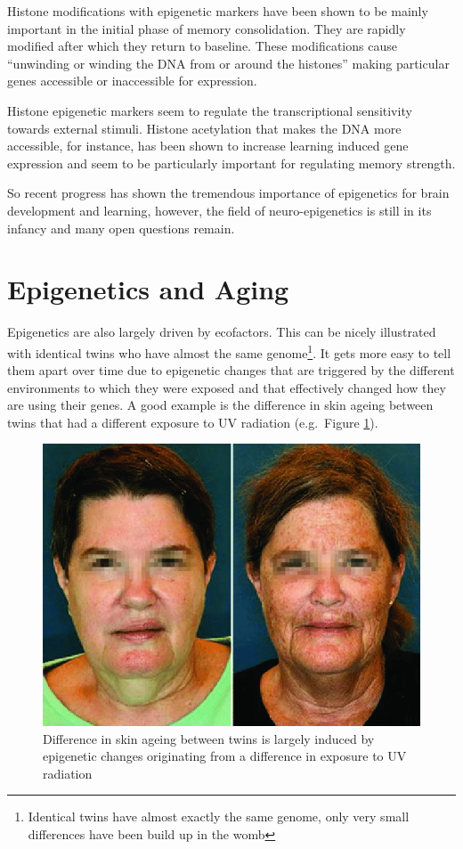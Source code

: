 \documentclass[
  11pt,
]{book}
\begin{document}
Histone modifications with epigenetic markers have been shown to be mainly important in the initial phase of memory consolidation. They are rapidly modified after which they return to baseline. These modifications cause ``unwinding or winding the DNA from or around the histones'' making particular genes accessible or inaccessible for expression.

Histone epigenetic markers seem to regulate the transcriptional sensitivity towards external stimuli. Histone acetylation that makes the DNA more accessible, for instance, has been shown to increase learning induced gene expression and seem to be particularly important for regulating memory strength.

So recent progress has shown the tremendous importance of epigenetics for brain development and learning, however, the field of neuro-epigenetics is still in its infancy and many open questions remain.

\hypertarget{epigenetics-and-aging}{%
\section{Epigenetics and Aging}\label{epigenetics-and-aging}}

Epigenetics are also largely driven by ecofactors. This can be nicely illustrated with identical twins who have almost the same genome\footnote{Identical twins have almost exactly the same genome, only very small differences have been build up in the womb}. It gets more easy to tell them apart over time due to epigenetic changes that are triggered by the different environments to which they were exposed and that effectively changed how they are using their genes. A good example is the difference in skin ageing between twins that had a different exposure to UV radiation (e.g.~Figure \ref{fig:epiUV}).



\begin{figure}

{\centering \includegraphics[width=0.5\linewidth]{./figs/dentical-twins-with-phenotypic-discordance-due-to-environmental-exposure-Although-MZ} 

}

\caption{Difference in skin ageing between twins is largely induced by epigenetic changes originating from a difference in exposure to UV radiation \citep{Schwab2017}}\label{fig:epiUV}
\end{figure}
\end{document}
